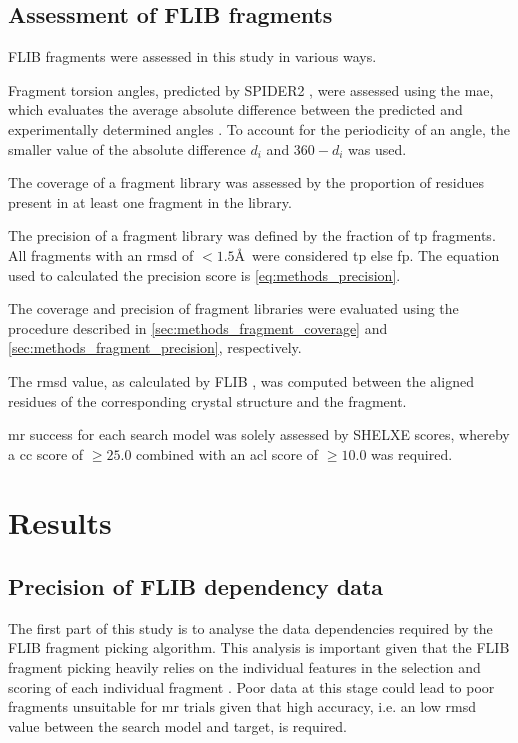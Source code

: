 \subsection{Assessment of FLIB fragments}
FLIB fragments were assessed in this study in various ways. 

Fragment torsion angles, predicted by SPIDER2 \cite{Heffernan2015-wp}, were assessed using the \gls{mae}, which evaluates the average absolute difference between the predicted and experimentally determined angles \cite{Heffernan2015-wp}. To account for the periodicity of an angle, the smaller value of the absolute difference $d_i$ and $360-d_i$ was used. 

The coverage of a fragment library was assessed by the proportion of residues present in at least one fragment in the library.

The precision of a fragment library was defined by the fraction of \gls{tp} fragments. All fragments with an \gls{rmsd} of $<1.5$\AA\ were considered \gls{tp} else \gls{fp}. The equation used to calculated the precision score is \cref{eq:methods_precision}.


The coverage and precision of fragment libraries were evaluated using the procedure described in \cref{sec:methods_fragment_coverage} and \cref{sec:methods_fragment_precision}, respectively.

The \gls{rmsd} value, as calculated by FLIB \cite{De_Oliveira2015-ba}, was computed between the aligned residues of the corresponding crystal structure and the fragment.

\Gls{mr} success for each search model was solely assessed by SHELXE scores, whereby a \gls{cc} score of $\geq25.0$ combined with an \gls{acl} score of $\geq10.0$ was required.

\section{Results}
\subsection{Precision of FLIB dependency data}
The first part of this study is to analyse the data dependencies required by the FLIB fragment picking algorithm. This analysis is important given that the FLIB fragment picking heavily relies on the individual features in the selection and scoring of each individual fragment \cite{De_Oliveira2015-ba}. Poor data at this stage could lead to poor fragments unsuitable for \gls{mr} trials given that high accuracy, i.e. an low \gls{rmsd} value between the search model and target, is required.

